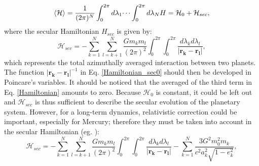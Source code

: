 \documentclass[12pt]{article}
\begin{document}
	\begin{equation}
	\braket{\mathcal{H}} = \frac{1}{(2 \pi)^N}\int_{0}^{2\pi} d \lambda_1 \dots \int_{0}^{2\pi} d \lambda_N H = \mathcal{H}_0 + \mathcal{H}_{sec},
	\end{equation}
	where the secular Hamiltonian $H_{sec}$ is given by:
	\begin{equation} \label{Hamiltonian_sec0}
	\mathcal{H}_{sec} = - \sum_{k=1}^N \sum_{l=k+1}^N \frac{G m_k m_l}{(2\pi)^2} \int_{0}^{2\pi}  \int_{0}^{2\pi} \frac{d\lambda_k d \lambda_l }{|\boldsymbol{r_k} - \boldsymbol{r_l}| },   
	\end{equation}
	which represents the total azimuthally averaged interaction between two planets. The function $ |\boldsymbol{r_k} - \boldsymbol{r_l}|^{-1} $ in Eq. \ref{Hamiltonian_sec0} should then be developed in Poincare's variables. It should be noticed that the averaged of the third term in Eq. \ref{Hamiltonian} amounts to zero. Because $\mathcal{H}_0$ is constant, it could be left out and $\mathcal{H}_{sec}$ is thus sufficient to describe the secular evolution of the planetary system. However, for a long-term dynamics, relativistic correction could be important, especially for Mercury; therefore they must be taken into account in the secular Hamiltonian (eg. \cite{federico2017}):
	\begin{equation} \label{Hamiltonian_sec}
	\mathcal{H}_{sec} = - \sum_{k=1}^N \sum_{l=k+1}^N \frac{G m_k m_l}{(2\pi)^2} \int_{0}^{2\pi}  \int_{0}^{2\pi} \frac{d\lambda_k d \lambda_l }{|\boldsymbol{r_k} - \boldsymbol{r_l}| } - \sum^N_{k=1} \frac{3 G^2 m_0^2 m_k}{c^2 a_k^2 \sqrt{1-e_k^2}} ,    
	\end{equation}
	
\end{document}
